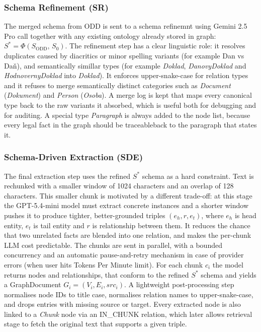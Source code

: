 \documentclass[conference]{IEEEtran}
\begin{document}
\subsubsection{Schema Refinement (SR)}
The merged schema from ODD is sent to a schema refinemnt using Gemini 2.5 Pro call together with any existing ontology already stored in graph: $S^{\ast}=\Phi(S_{\text{ODD}},\,S_0)$. The refinement step has a clear linguistic role: it resolves duplicates caused by diacritics or minor spelling variants (for example Dan vs Daň), and semantically simillar types (for example \textit{Doklad}, \textit{DanovyDoklad} and \textit{HodnovernyDoklad} into \textit{Doklad}). It enforces upper-snake-case for relation types and it refuses to merge semantically distinct categories such as \textit{Document} (\textit{Dokument}) and \textit{Person} (\textit{Osoba}). A merge log is kept that maps every canonical type back to the raw variants it absorbed, which is useful both for debugging and for auditing. A special type \textit{Paragraph} is always added to the node list, because every legal fact in the graph should be traceableback to the paragraph that states it.

\subsubsection{Schema-Driven Extraction (SDE)}
The final extraction step uses the refined $S^{\ast}$ schema as a hard constraint. Text is rechunked with a smaller window of 1024 characters and an overlap of 128 characters. This smaller chunk is motivated by a different trade-off: at this stage the GPT-5.4-mini model must extract concrete instances and a shorter window pushes it to produce tighter, better-grounded triples $(e_h, r, e_t)$, where $e_h$ is head entity, $e_t$ is tail entity and $r$ is relationship between them. It reduces the chance that two unrelated facts are blended into one relation, and makes the per-chunk LLM cost predictable. The chunks are sent in parallel, with a bounded concurrency and an automatic pause-and-retry mechanism in case of provider errors (when user hits Tokens Per Minute limit). For each chunk $c_i$ the model returns nodes and relationships, that conform to the refined $S^{\ast}$ schema and yields a GraphDocument $G_i = (V_i, E_i, src_i)$. A lightweight post-processing step normalises node IDs to title case, normalises relation names to upper-snake-case, and drops entries with missing source or target. Every extracted node is also linked to a \textit{Chunk} node via an IN\_CHUNK relation, which later allows retrieval stage to fetch the original text that supports a given triple.
\end{document}
